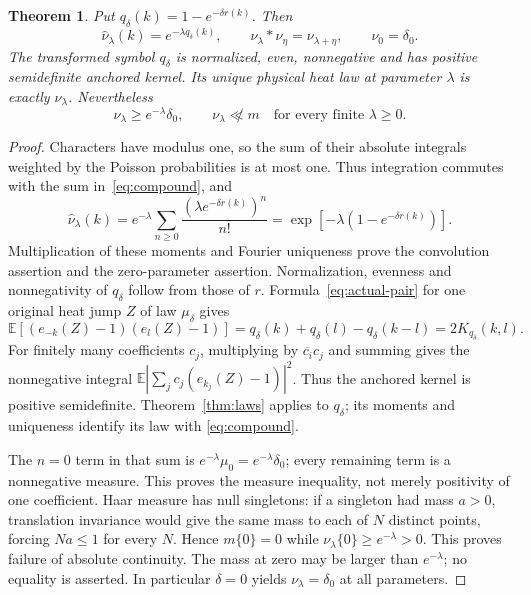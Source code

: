 \documentclass[11pt]{article}
\newtheorem{theorem}{Theorem}[section]
\theoremstyle{remark}\newtheorem{remark}[theorem]{Remark}
\begin{document}
\begin{theorem}\label{thm:compound}
Put $q_\delta(k)=1-e^{-\delta r(k)}$. Then
\[
 \widehat\nu_\lambda(k)=e^{-\lambda q_\delta(k)},\qquad
 \nu_\lambda*\nu_\eta=\nu_{\lambda+\eta},\qquad
 \nu_0=\delta_0.
\]
The transformed symbol $q_\delta$ is normalized, even, nonnegative
and has positive semidefinite anchored kernel. Its unique physical
heat law at parameter $\lambda$ is exactly $\nu_\lambda$.
Nevertheless
\begin{equation}\label{eq:atom}
 \nu_\lambda\geq e^{-\lambda}\delta_0,
 \qquad \nu_\lambda\not\ll m
 \quad\text{for every finite }\lambda\geq0.
\end{equation}
\end{theorem}
\begin{proof}
Characters have modulus one, so the sum of their absolute integrals
weighted by the Poisson probabilities is at most one. Thus integration
commutes with the sum in~\eqref{eq:compound}, and
\[
 \widehat\nu_\lambda(k)
 =e^{-\lambda}\sum_{n\geq0}\frac{(\lambda e^{-\delta r(k)})^n}{n!}
 =\exp[-\lambda(1-e^{-\delta r(k)})].
\]
Multiplication of these moments and Fourier uniqueness prove the
convolution assertion and the zero-parameter assertion.
Normalization, evenness and nonnegativity of $q_\delta$ follow from
those of $r$. Formula~\eqref{eq:actual-pair} for one original heat
jump $Z$ of law $\mu_\delta$ gives
\begin{equation}\label{eq:jump-gram}
 \mathbb E[(e_{-k}(Z)-1)(e_l(Z)-1)]
 =q_\delta(k)+q_\delta(l)-q_\delta(k-l)
 =2K_{q_\delta}(k,l).
\end{equation}
For finitely many coefficients $c_j$, multiplying by
$\overline{c_i}c_j$ and summing gives the nonnegative integral
$\mathbb E|\sum_jc_j(e_{k_j}(Z)-1)|^2$. Thus the anchored kernel
is positive semidefinite. Theorem~\ref{thm:laws} applies to
$q_\delta$; its moments and uniqueness identify its law with
\eqref{eq:compound}.

The $n=0$ term in that sum is $e^{-\lambda}\mu_0
=e^{-\lambda}\delta_0$; every remaining term is a nonnegative
measure. This proves the measure inequality, not merely positivity
of one coefficient. Haar measure has null singletons: if a singleton
had mass $a>0$, translation invariance would give the same mass to
each of $N$ distinct points, forcing $Na\leq1$ for every $N$.
Hence $m\{0\}=0$ while $\nu_\lambda\{0\}\geq e^{-\lambda}>0$.
This proves failure of absolute continuity. The mass at zero may be
larger than $e^{-\lambda}$; no equality is asserted. In particular
$\delta=0$ yields $\nu_\lambda=\delta_0$ at all parameters.
\end{proof}
\end{document}
